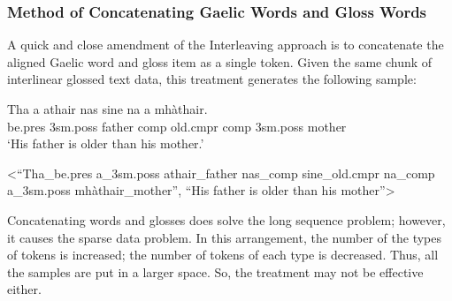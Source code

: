 \documentclass[final]{ua-thesis}
\numberwithin{equation}{section}
\begin{document}
\subsubsection{Method of Concatenating Gaelic Words and Gloss Words }\label{treatment:Concating}
A quick and close amendment of the Interleaving approach is to concatenate the aligned Gaelic word and gloss item as a single token. Given the same chunk of interlinear glossed text data, this treatment generates the following sample:

\begin{exe} 
\ex 
	\begin{xlist}
	\ex 
		\gll	 Tha a athair nas sine na a mh\`athair.\\  
     		     be.pres 3sm.poss father comp old.cmpr comp 3sm.poss mother \\
    	\glt    `His father is older than his mother.'  

    \ex <``Tha\_be.pres a\_3sm.poss athair\_father nas\_comp sine\_old.cmpr na\_comp a\_3sm.poss mh\`athair\_mother'', ``His father is older than his mother''>
    \end{xlist}
\end{exe}

Concatenating words and glosses does solve the long sequence problem; however, it causes the sparse data problem. In this arrangement, the number of the types of tokens is increased; the number of tokens of each type is decreased. Thus, all the samples are put in a larger space. So, the treatment may not be effective either. 
\end{document}
